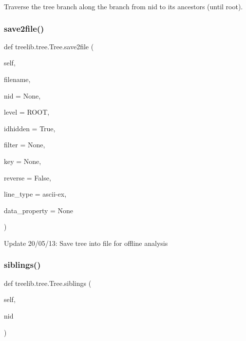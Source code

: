 \begin{DoxyVerb}Traverse the tree branch along the branch from nid to its
ancestors (until root).
\end{DoxyVerb}
 \mbox{\label{classtreelib_1_1tree_1_1Tree_afd71be661a3e735c629e1c533b444734}} 
\subsubsection{\texorpdfstring{save2file()}{save2file()}}
{\footnotesize\ttfamily def treelib.\+tree.\+Tree.\+save2file (\begin{DoxyParamCaption}\item[{}]{self,  }\item[{}]{filename,  }\item[{}]{nid = {\ttfamily None},  }\item[{}]{level = {\ttfamily ROOT},  }\item[{}]{idhidden = {\ttfamily True},  }\item[{}]{filter = {\ttfamily None},  }\item[{}]{key = {\ttfamily None},  }\item[{}]{reverse = {\ttfamily False},  }\item[{}]{line\+\_\+type = {\ttfamily \textquotesingle{}ascii-\/ex\textquotesingle{}},  }\item[{}]{data\+\_\+property = {\ttfamily None} }\end{DoxyParamCaption})}

\begin{DoxyVerb}Update 20/05/13: Save tree into file for offline analysis\end{DoxyVerb}
 \mbox{\label{classtreelib_1_1tree_1_1Tree_a9db8ff11f2c857dd552b43ce8b42459c}} 
\subsubsection{\texorpdfstring{siblings()}{siblings()}}
{\footnotesize\ttfamily def treelib.\+tree.\+Tree.\+siblings (\begin{DoxyParamCaption}\item[{}]{self,  }\item[{}]{nid }\end{DoxyParamCaption})}

